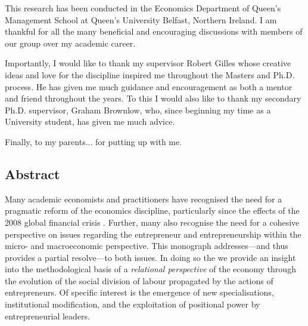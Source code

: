 \documentclass[11pt,fleqn]{book}
\begin{document}
This research has been conducted in the Economics Department of Queen's Management School at Queen's University Belfast, Northern Ireland. I am thankful for all the many beneficial and encouraging discussions with members of our group over my academic career. 

Importantly, I would like to thank my supervisor Robert Gilles whose creative ideas and love for the discipline inspired me throughout the Masters and Ph.D. process. He has given me much guidance and encouragement as both a mentor and friend throughout the years. To this I would also like to thank my secondary Ph.D. supervisor, Graham Brownlow, who, since beginning my time as a University student, has given me much advice.

\medskip\noindent Finally, to my parents... for putting up with me.

\newpage

\setcounter{page}{1} 

\begin{singlespace}
\setcounter{tocdepth}{2}
\tableofcontents

\listoffigures

\chapter*{Abstract}


Many academic economists and practitioners have recognised the need for a pragmatic reform of the economics discipline, particularly since the effects of the 2008 global financial crisis \citep{Hodgson2009}. Further, many also recognise the need for a cohesive perspective on issues regarding the entrepreneur and entrepreneurship within the micro- and macroeconomic perspective. This monograph addresses---and thus provides a partial resolve---to both issues. In doing so the we provide an insight into the methodological basis of a \emph{relational perspective} of the economy through the evolution of the social division of labour propagated by the actions of entrepreneurs. Of specific interest is the emergence of new specialisations, institutional modification, and the exploitation of positional power by entrepreneurial leaders.

\end{singlespace}

\newpage













\singlespace




\end{document}
